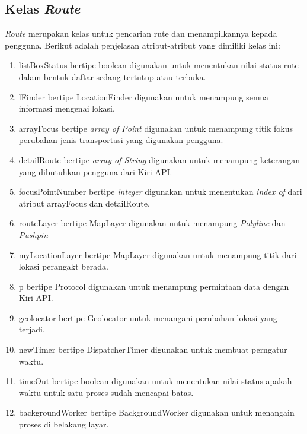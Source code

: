 \subsection{Kelas \textit{Route}}
\label{lab:Kelas Route}
\hspace{0.5cm} \textit{Route} merupakan kelas untuk pencarian rute dan menampilkannya kepada pengguna. Berikut adalah penjelasan atribut-atribut yang dimiliki kelas ini:
\begin{enumerate}
	\item listBoxStatus bertipe boolean digunakan untuk menentukan nilai status rute dalam bentuk daftar sedang tertutup atau terbuka. 
	\item lFinder bertipe LocationFinder digunakan untuk menampung semua informasi mengenai lokasi.
	\item arrayFocus bertipe \textit{array of Point} digunakan untuk menampung titik fokus perubahan jenis transportasi yang digunakan pengguna.  
	\item detailRoute bertipe \textit{array of String} digunakan untuk menampung keterangan yang dibutuhkan pengguna dari Kiri API.
	\item focusPointNumber bertipe \textit{integer} digunakan untuk menentukan \textit{index of} dari atribut arrayFocus dan detailRoute.
	\item routeLayer bertipe MapLayer digunakan untuk menampung \textit{Polyline} dan \textit{Pushpin}
	\item myLocationLayer bertipe MapLayer digunakan untuk menampung titik dari lokasi perangakt berada.
	\item p bertipe Protocol digunakan untuk menampung permintaan data dengan Kiri API.
	\item geolocator bertipe Geolocator untuk menangani perubahan lokasi yang terjadi.
	\item newTimer bertipe DispatcherTimer digunakan untuk membuat perngatur waktu.
	\item timeOut bertipe boolean digunakan untuk menentukan nilai status apakah waktu untuk satu proses sudah mencapai batas.
	\item backgroundWorker bertipe BackgroundWorker digunakan untuk menangain proses di belakang layar.
\end{enumerate}

